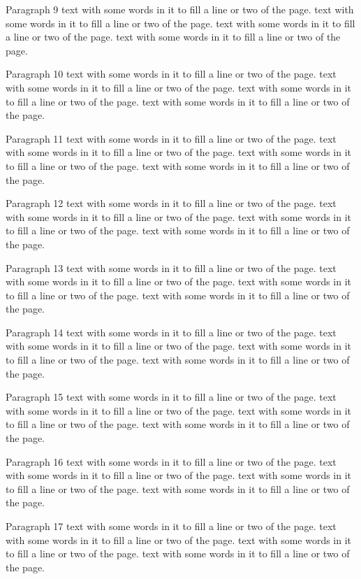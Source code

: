 \documentclass{article}
\begin{document}
Paragraph 9 text with some words in it to fill a line or two of the page. text with some words in it to fill a line or two of the page. text with some words in it to fill a line or two of the page. text with some words in it to fill a line or two of the page. 

Paragraph 10 text with some words in it to fill a line or two of the page. text with some words in it to fill a line or two of the page. text with some words in it to fill a line or two of the page. text with some words in it to fill a line or two of the page. 

Paragraph 11 text with some words in it to fill a line or two of the page. text with some words in it to fill a line or two of the page. text with some words in it to fill a line or two of the page. text with some words in it to fill a line or two of the page. 

Paragraph 12 text with some words in it to fill a line or two of the page. text with some words in it to fill a line or two of the page. text with some words in it to fill a line or two of the page. text with some words in it to fill a line or two of the page. 

Paragraph 13 text with some words in it to fill a line or two of the page. text with some words in it to fill a line or two of the page. text with some words in it to fill a line or two of the page. text with some words in it to fill a line or two of the page. 

Paragraph 14 text with some words in it to fill a line or two of the page. text with some words in it to fill a line or two of the page. text with some words in it to fill a line or two of the page. text with some words in it to fill a line or two of the page. 

Paragraph 15 text with some words in it to fill a line or two of the page. text with some words in it to fill a line or two of the page. text with some words in it to fill a line or two of the page. text with some words in it to fill a line or two of the page. 

Paragraph 16 text with some words in it to fill a line or two of the page. text with some words in it to fill a line or two of the page. text with some words in it to fill a line or two of the page. text with some words in it to fill a line or two of the page. 

Paragraph 17 text with some words in it to fill a line or two of the page. text with some words in it to fill a line or two of the page. text with some words in it to fill a line or two of the page. text with some words in it to fill a line or two of the page. 
\end{document}
